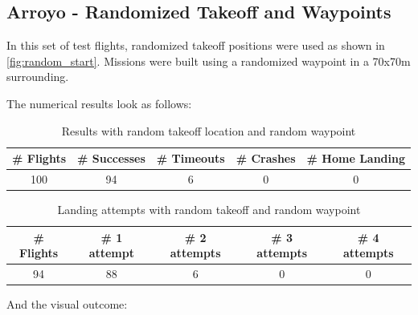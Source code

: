 \subsection{Arroyo - Randomized Takeoff and Waypoints}\label{subsec:compl_rand}

    In this set of test flights, randomized takeoff positions were used as shown in \cref{fig:random_start}. Missions were built using a randomized waypoint in a 70x70m surrounding.

    The numerical results look as follows:

    \begin{table}[h]
        \begin{center}
         \caption{Results with random takeoff location and random waypoint}\vspace{1ex}
         \label{tab:result_complete_rand}
         \begin{tabular}{|c|c|c|c|c|}
         \hline
         \# Flights & \# Successes & \# Timeouts & \# Crashes & \# Home Landing\\ \hline \hline
         100 & 94 & 6 & 0 & 0 \\
         \hline
         \end{tabular}
        \end{center}
    \end{table}
    \begin{table}[h]
        \begin{center}
         \caption{Landing attempts with random takeoff and random waypoint}\vspace{1ex}
         \label{tab:land_nums_complete_rand}
         \begin{tabular}{|c|c|c|c|c|}
         \hline
         \# Flights & \# 1 attempt & \# 2 attempts & \# 3 attempts & \# 4 attempts\\ \hline \hline
         94 & 88 & 6 & 0 & 0 \\
         \hline
         \end{tabular}
        \end{center}
    \end{table}

    And the visual outcome:

